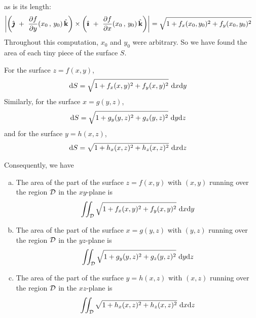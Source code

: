 as is its length:
\begin{align*}
\left|\left(\hj\ +\   \pdiff{f}{y}(x_0\,,\,y_0)\,\hk\right)\times
              \left(\hi\ +\   \pdiff{f}{x}(x_0\,,\,y_0)\,\hk\right)\right|
&= \sqrt{1 + f_x(x_0,y_0)^2 + f_y(x_0,y_0)^2}
\end{align*}
Throughout this computation, $x_0$ and $y_0$ were arbitrary.
So we have found the area of each tiny piece of the surface $S$.
\begin{impeqn}\label{eq dSgraph}
For the surface $z=f(x,y)$,
\begin{align*}
\dee{S}&= \sqrt{1 + f_x(x,y)^2 + f_y(x,y)^2}\ 
          \dee{x}\dee{y}
\end{align*}
Similarly, for the surface $x=g(y,z)$, 
\begin{align*}
\dee{S}&= \sqrt{1 + g_y(y,z)^2 + g_z(y,z)^2}\ 
          \dee{y}\dee{z}
\end{align*}
and for the surface $y=h(x,z)$,
\begin{align*}
\dee{S}&= \sqrt{1 + h_x(x,z)^2 + h_z(x,z)^2}\ 
          \dee{x}\dee{z}
\end{align*}
\end{impeqn}
Consequently, we have
\begin{theorem}\label{thm surface area}
\begin{enumerate}[(a)]
\item
The area of the part of the surface $z=f(x,y)$ with $(x,y)$ running over the
region $\mathcal{D}$ in the $xy$-plane is
\begin{equation*}
\dblInt_\cD \sqrt{1 + f_x(x,y)^2 + f_y(x,y)^2}\ 
          \dee{x}\dee{y}
\end{equation*}
\item
The area of the part of the surface $x=g(y,z)$ with $(y,z)$ running over the
region $\mathcal{D}$ in the $yz$-plane is
\begin{equation*}
\dblInt_\cD \sqrt{1 + g_y(y,z)^2 + g_z(y,z)^2}\ 
          \dee{y}\dee{z}
\end{equation*}

\item
The area of the part of the surface $y=h(x,z)$ with $(x,z)$ running over the
region $\mathcal{D}$ in the $xz$-plane is
\begin{equation*}
\dblInt_\cD \sqrt{1 + h_x(x,z)^2 + h_z(x,z)^2}\ 
          \dee{x}\dee{z}
\end{equation*}
\end{enumerate}
\end{theorem}
